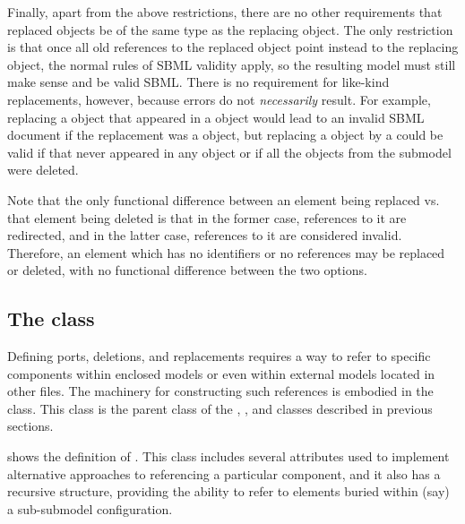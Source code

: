 Finally, apart from the above restrictions, there are no other
requirements that replaced objects be of the
same type as the replacing object.  The only restriction is that
once all old references to the replaced object point instead to the
replacing object, the normal rules of SBML validity apply, so the
resulting model must still make sense and be valid SBML.  There is no
requirement for like-kind replacements, however, because errors do not
\emph{necessarily} result.  For example, replacing a \Species object
that appeared in a \Reaction object would lead to an invalid SBML
document if the replacement was a \Parameter object, but replacing a
\Species object by a \Parameter could be valid if that \Species never
appeared in any \Reaction object or if all the \Reaction objects from
the submodel were deleted.

Note that the only functional difference between an element being replaced
vs. that element being deleted is that in the former case, references
to it are redirected, and in the latter case, references to it are 
considered invalid.  Therefore, an element which has no identifiers or
no references may be replaced or deleted, with no functional difference
between the two options.

\subsection{The  class}
\label{sbaseref-class}

Defining ports, deletions, and replacements requires a way to refer to
specific components within enclosed models or even within external models
located in other files.  The machinery for constructing such references
is embodied in the \SBaseRef class.  This class is the parent class of
the \Port, \Deletion, \ReplacedElement and \ReplacedBy classes described
in previous sections.

 shows the definition of \SBaseRef.  This class
includes several attributes used to implement alternative approaches to
referencing a particular component, and it also has a recursive
structure, providing the ability to refer to elements buried within
(say) a sub-submodel configuration.


